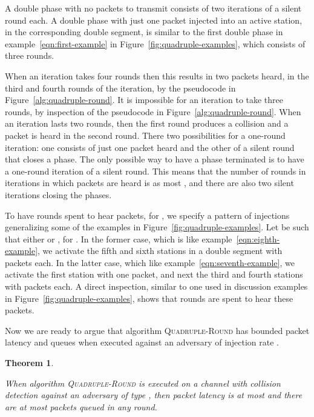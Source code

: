 \documentclass[11pt]{article}
\newcommand{\qed}{\hfill  \smallbreak}
\newenvironment{proof}{\noindent{\bf Proof:}}{\qed}
\newtheorem{theorem}{Theorem}
\begin{document}
\begin{proof}
A double phase with no packets to transmit consists of two iterations of a silent round each.
A double phase with just one packet injected into an active station, in the corresponding double segment, is similar to the first double phase in example~\eqref{eqn:first-example} in Figure~\ref{fig:quadruple-examples}, which consists of three rounds.

When an iteration takes four rounds then this results in two packets heard, in the third and fourth rounds of the iteration, by the pseudocode in Figure~\ref{alg:quadruple-round}.
It is impossible for an iteration to take three rounds, by inspection of the pseudocode in Figure~\ref{alg:quadruple-round}.
When an iteration lasts two rounds, then the first round produces a collision and a packet is heard in the second round.
There two possibilities for a one-round iteration: one consists of just one packet heard and the other 
 of a silent round that closes a phase. 
The only possible way to have a phase terminated is to have a one-round iteration of a silent round.
This means that the number of rounds in iterations in which packets are heard is as most , and there are also two silent iterations closing the phases.

To have  rounds  spent to hear  packets, for , we  specify a pattern of injections generalizing some of the examples in Figure~\ref{fig:quadruple-examples}.
Let  be such that either  or , for .
In the former case, which is like example~\ref{eqn:eighth-example}, we activate the fifth and sixth stations in a double segment with  packets each.
In the latter case, which like example~\ref{eqn:seventh-example}, we activate the first station with one packet, and next the third and fourth stations with   packets each.
A direct inspection, similar to one used in discussion examples in Figure~\ref{fig:quadruple-examples}, shows that  rounds are spent to hear these  packets.
\end{proof}


Now we are ready to argue that algorithm \textsc{Quadruple-Round} has bounded packet latency and queues when executed against an adversary of injection rate .




\begin{theorem}
\label{thm:quadruple-round}

When algorithm \textsc{Quadruple-Round} is executed on a channel with collision detection against an adversary of type , then packet latency is at most  and there are at most  packets queued in any round.
\end{theorem}
\end{document}
